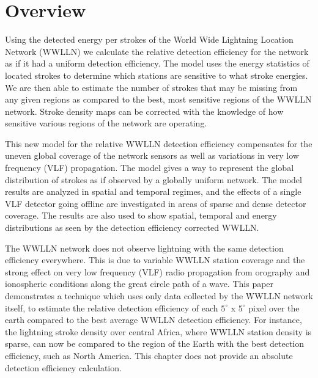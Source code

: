 
\section{Overview}


Using the detected energy per strokes of the World Wide Lightning Location Network (WWLLN) we calculate the relative detection efficiency for the network as if it had a uniform  detection efficiency.
The model uses the energy statistics of located strokes to determine which stations are sensitive to what stroke energies.
We are then able to estimate the number of strokes that may be missing from any given regions as compared to the best, most sensitive regions of the WWLLN network.
Stroke density maps can be corrected with the knowledge of how sensitive various regions of the network are operating.

This new model for the relative WWLLN detection efficiency compensates for the uneven global coverage of the network sensors as well as variations in very low frequency (VLF) propagation.
The model gives a way to represent the global distribution of strokes as if observed by a globally uniform network.
The model results are analyzed in spatial and temporal regimes, and the effects of a single VLF detector going offline are investigated in areas of sparse and dense detector coverage.
The results are also used to show spatial, temporal and energy distributions as seen by the detection efficiency corrected WWLLN.

The WWLLN network does not observe lightning with the same detection efficiency everywhere.
This is due to variable WWLLN station coverage and the strong effect on very low frequency (VLF) radio propagation from orography and ionospheric conditions along the great circle path of a wave.
This paper demonstrates a technique which uses only data collected by the WWLLN network itself, to estimate the relative detection efficiency of each $5^\circ$ x $5^\circ$ pixel over the earth compared to the best average WWLLN detection efficiency.
For instance, the lightning stroke density over central Africa, where WWLLN station density is sparse, can now be compared to the region of the Earth with the best detection efficiency, such as North America.
This chapter does not provide an absolute detection efficiency calculation.

